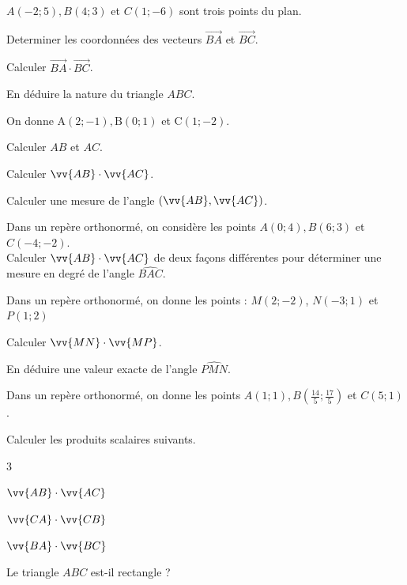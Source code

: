 \documentclass[11pt,a4paper]{article}  %
\begin{document}
\exercice{}
$A(-2 ; 5), B(4 ; 3)$ et $C(1 ;-6)$ sont trois points du plan.
\begin{enumMet}
	\item Determiner les coordonnées des vecteurs $\overrightarrow{B A}$ et $\overrightarrow{B C}$.
	\item Calculer $\overrightarrow{B A} \cdot \overrightarrow{B C}$.
	\item En déduire la nature du triangle $A B C$.
\end{enumMet}

\exercice{}
On donne $\mathrm{A}(2 ;-1), \mathrm{B}(0 ; 1)$ et $\mathrm{C}(1 ;-2)$.
\begin{enumMet}
	\item Calculer $A B$ et $A C$.
	\item Calculer $\vv{AB} \cdot \vv{AC}$.
	\item Calculer une mesure de l'angle $(\vv{AB}, \vv{AC})$.
\end{enumMet}

\exercice{}
Dans un repère orthonormé, on considère les points $A(0 ; 4), B(6 ; 3)$ et $C(-4 ;-2)$.\\
Calculer $\vv{A B} \cdot \vv{A C}$ de deux façons différentes pour déterminer une mesure en degré de l'angle $\widehat{B A C}$.

\exercice{}
Dans un repère orthonormé, on donne les points : $M(2;-2)$, $N(-3;1)$ et $P(1;2)$
\begin{enumMet}
	\item Calculer $\vv{M N} \cdot \vv{M P}$.
	\item En déduire une valeur exacte de l'angle $\widehat{P M N}$.
\end{enumMet}

\exercice{}
Dans un repère orthonormé, on donne les points $A(1 ; 1), B\left(\frac{14}{5} ; \frac{17}{5}\right)$ et $C(5 ; 1)$.
\begin{enumMet}
	\item Calculer les produits scalaires suivants.
	\begin{enumMet}
		\begin{multicols}{3}
		\item $\vv{A B} \cdot \vv{A C}$
		\item $\vv{C A} \cdot \vv{C B}$
		\item $\vv{B A} \cdot \vv{B C}$
		\end{multicols}
	\end{enumMet}
	\item Le triangle $A B C$ est-il rectangle ?
\end{enumMet}
\end{document}
